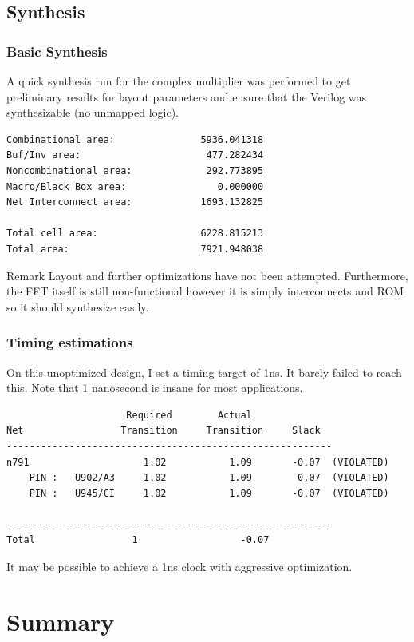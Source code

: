 \documentclass{beamer}
\begin{document}
\subsection{Synthesis}
\begin{frame}[fragile]
	\frametitle{Basic Synthesis}
A quick synthesis run for the complex multiplier was performed to get preliminary results
for layout parameters and ensure that the Verilog was synthesizable (no unmapped logic).

\begin{verbatim}
Combinational area:               5936.041318
Buf/Inv area:                      477.282434
Noncombinational area:             292.773895
Macro/Black Box area:                0.000000
Net Interconnect area:            1693.132825

Total cell area:                  6228.815213
Total area:                       7921.948038
\end{verbatim}
\begin{block}{Remark}
Layout and further optimizations have not been attempted. Furthermore, the FFT itself is still non-functional
however it is simply interconnects and ROM so it should synthesize easily.
\end{block}
\end{frame}

\begin{frame}[fragile]
	\frametitle{Timing estimations}
	On this unoptimized design, I set a timing target of 1ns. It barely failed to reach this.
	Note that 1 nanosecond is insane for most applications.

\begin{verbatim}
                     Required        Actual
Net                 Transition     Transition     Slack
---------------------------------------------------------
n791                    1.02           1.09       -0.07  (VIOLATED)
    PIN :   U902/A3     1.02           1.09       -0.07  (VIOLATED)
    PIN :   U945/CI     1.02           1.09       -0.07  (VIOLATED)

---------------------------------------------------------
Total                 1                  -0.07
\end{verbatim}
It may be possible to achieve a 1ns clock with aggressive optimization.
\end{frame}

\section{Summary}
\end{document}
